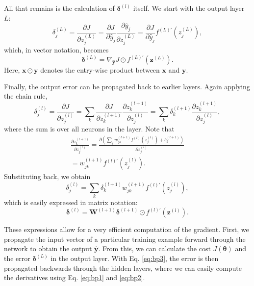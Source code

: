 All that remains is the calculation of $\bm{\delta}^{(l)}$ itself. We start with the output layer $L$:
\begin{equation}
\delta_j^{(L)} = \frac{\partial J}{\partial z_j^{(L)}}
= \frac{\partial J}{\partial \hat{y}_j} \frac{\partial \hat{y}_j}{\partial z_j^{(L)}}
= \frac{\partial J}{\partial \hat{y}_j} f^{(L)\prime}\left (z_j^{(L)}\right ),
\end{equation}
which, in vector notation, becomes
\begin{equation}
\bm{\delta}^{(L)} = \nabla_{\hat{\bm{y}}}J \odot f^{(L)\prime}\left (\bm{z}^{(L)}\right ).
\end{equation}
Here, $\bm{x} \odot \bm{y}$ denotes the entry-wise product between $\bm{x}$ and $\bm{y}$.

Finally, the output error can be propagated back to earlier layers. Again applying the chain rule,
\begin{equation}
\delta_j^{(l)} = \frac{\partial J}{\partial z_j^{(l)}}
= \sum_k \frac{\partial J}{\partial z_k^{(l+1)}} \frac{\partial z_k^{(l+1)}}{\partial z_j^{(l)}}
= \sum_k \delta_k^{(l+1)} \frac{\partial z_k^{(l+1)}}{\partial z_j^{(l)}},
\end{equation}
where the sum is over all neurons in the  layer. Note that
\begin{equation}
\begin{gathered}
\frac{\partial z_k^{(l+1)}}{\partial z_j^{(l)}}
= \frac{\partial\left (
	\sum_j w_{jk}^{(l+1)}f^{(l)}\left (z_j^{(l)}\right )+b_k^{(l+1)}
	\right )}{\partial z_j^{(l)}}\\
= w_{jk}^{(l+1)}f^{(l)\prime}\left (z_j^{(l)}\right ).
\end{gathered}
\end{equation}
Substituting back, we obtain
\begin{equation}
\delta_j^{(l)} = \sum_k \delta_k^{(l+1)} w_{jk}^{(l+1)}f^{(l)\prime}\left (z_j^{(l)}\right ),
\end{equation}
which is easily expressed in matrix notation:
\begin{equation}\label{eq:bp3}
\bm{\delta}^{(l)} = \bm{W}^{(l+1)} \bm{\delta}^{(l+1)} \odot f^{(l)\prime}\left (\bm{z}^{(l)}\right ).
\end{equation}

These expressions allow for a very efficient computation of the gradient. First, we propagate the input vector of a particular training example forward through the network to obtain the output $\hat{\bm{y}}$. From this, we can calculate the cost $J(\bm{\theta})$ and the error $\bm{\delta}^{(L)}$ in the output layer. With Eq. \eqref{eq:bp3}, the error is then propagated backwards through the hidden layers, where we can easily compute the derivatives using Eq. \eqref{eq:bp1} and \eqref{eq:bp2}.

